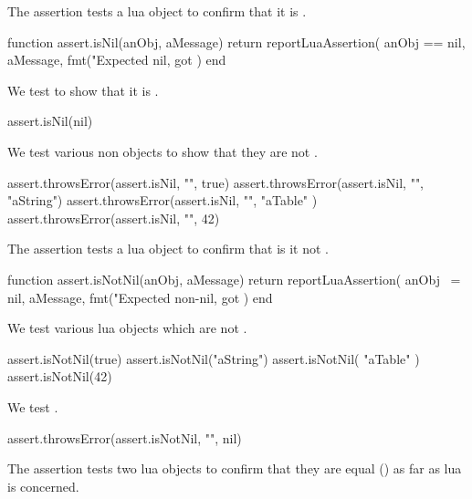 \stopTestSuite


The  assertion tests a lua object to confirm that it is 
. 

\startLuaCode
function assert.isNil(anObj, aMessage)
  return reportLuaAssertion(
    anObj == nil,
    aMessage,
    fmt("Expected nil, got %
  )
end
\stopLuaCode


We test  to show that it is . 

\startLuaTest
  assert.isNil(nil)
\stopLuaTest
\stopTestCase


We test various non  objects to show that they are not 
. 

\startLuaTest
  assert.throwsError(assert.isNil, "", true)
  assert.throwsError(assert.isNil, "", "aString")
  assert.throwsError(assert.isNil, "", { "aTable" })
  assert.throwsError(assert.isNil, "", 42)
\stopLuaTest
\stopTestCase

\stopTestSuite


The  assertion tests a lua object to confirm that is 
it not . 

\startLuaCode
function assert.isNotNil(anObj, aMessage)
  return reportLuaAssertion(
    anObj ~= nil,
    aMessage,
    fmt("Expected non-nil, got %
  )
end
\stopLuaCode


We test various lua objects which are not .

\startLuaTest
  assert.isNotNil(true)
  assert.isNotNil("aString")
  assert.isNotNil({ "aTable" })
  assert.isNotNil(42)
\stopLuaTest
\stopTestCase


We test .

\startLuaTest
  assert.throwsError(assert.isNotNil, "", nil)
\stopLuaTest
\stopTestSuite


The  assertion tests two lua objects to confirm that 
they are equal (\type{==}) as far as lua is concerned. 

